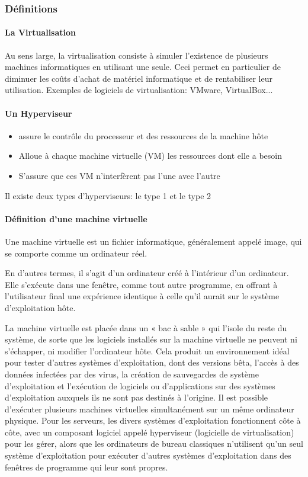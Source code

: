 \subsubsection{Définitions}

\paragraph{La Virtualisation}
 Au sens large, la virtualisation consiste à simuler l'existence de plusieurs machines informatiques en utilisant une seule.
 Ceci permet en particulier de diminuer les coûts d'achat de matériel informatique et de rentabiliser leur utilisation.
Exemples de logiciels de virtualisation: VMware, VirtualBox...

\paragraph{Un Hyperviseur}
\begin{itemize}
	\item assure le contrôle du processeur et des ressources de la machine hôte
	\item Alloue à chaque machine virtuelle (VM) les ressources dont elle a besoin
	\item S'assure que ces VM n'interfèrent pas l'une avec l'autre
\end{itemize}

Il existe deux types d'hyperviseurs: le type 1 et le type 2

\paragraph{Définition d'une machine virtuelle}

Une machine virtuelle est un fichier informatique, généralement appelé image, qui se comporte comme un ordinateur réel.\newline

En d’autres termes, il s’agit d’un ordinateur créé à l’intérieur d’un ordinateur. Elle s’exécute dans une fenêtre,
 comme tout autre programme, en offrant à l’utilisateur final une expérience identique à celle qu’il aurait sur le
 système d’exploitation hôte.

 La machine virtuelle est placée dans un « bac à sable » qui l’isole du reste du système,
 de sorte que les logiciels installés sur la machine virtuelle ne peuvent ni s’échapper, ni modifier l’ordinateur hôte.
 Cela produit un environnement idéal pour tester d’autres systèmes d’exploitation, dont des versions bêta,
 l’accès à des données infectées par des virus, la création de sauvegardes de système d’exploitation et l’exécution
 de logiciels ou d’applications sur des systèmes d’exploitation auxquels ils ne sont pas destinés à l’origine.
Il est possible d’exécuter plusieurs machines virtuelles simultanément sur un même ordinateur physique.
Pour les serveurs, les divers systèmes d’exploitation fonctionnent côte à côte, avec un composant logiciel appelé hyperviseur
(logicielle de virtualisation) pour les gérer, alors que les ordinateurs de bureau classiques n’utilisent qu’un seul
système d’exploitation pour exécuter d’autres systèmes d’exploitation dans des fenêtres de programme qui leur sont propres.



